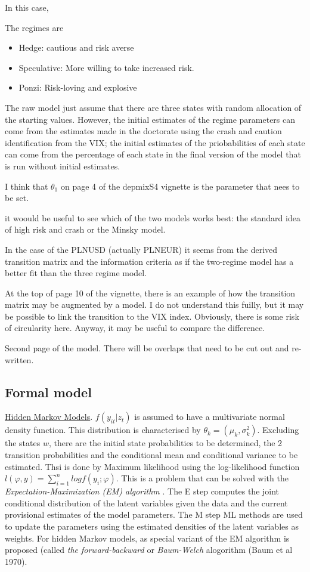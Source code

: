\documentclass[12pt, a4paper, oneside]{article} %
\begin{document}
In this case, 

The regimes are
\begin{itemize}
\item Hedge: cautious and risk averse
\item Speculative: More willing to take increased risk. 
\item Ponzi:  Risk-loving and explosive
\end{itemize}


The raw model just assume that there are three states with random allocation of the starting values.  However, the initial estimates of the regime parameters can come from the estimates made in the doctorate using the crash and caution identification from the VIX; the initial estimates of the priobabilities of each state can come from the percentage of each state in the final version of the model that is run without initial estimates.  

I think that $\theta_1$ on page 4 of the depmixS4 vignette is the parameter that nees to be set. 

it woould be useful to see which of the two models works best: the standard idea of high risk and crash or the Minsky model.  

In the case of the PLNUSD (actually PLNEUR) it seems from the derived transition matrix and the information criteria as if the two-regime model has a better fit than the three regime model. 

At the top of page 10 of the vignette, there is an example of how the transition matrix may be augmented by a model.  I do not understand this fuilly, but it may be possible to link the transition to the VIX index.  Obviously, there is some risk of circularity here. Anyway, it may be useful to compare the difference. 

Second page of the model.  There will be overlaps that need to be cut out and re-written. 

\subsection{Formal model}
\href{http://en.wikipedia.org/wiki/Hidden_Markov_model}{Hidden Markov Models}.  
$f(y_{it}|z_t)$ is assumed to have a multivariate normal density function. This distribution is characterised by $\theta_k = (\mu_k, \sigma_k^2)$.  Excluding the states $w$, there are the initial state probabilities to be determined, the 2 transition probabilities and the conditional mean and conditional variance to be estimated.  Thsi is done by Maximum likelihood using the log-likelihood function $l(\varphi, y) = \sum_{i=1}^n log f(y_i; \varphi)$. This is a problem that can be solved with the \emph{Expectation-Maximization (EM) algorithm} \citet{dempster1977maximum}. The E step computes the joint conditional distribution of the latent variables given the data and the current provisional estimates of the model parameters. The M step ML methods are used to update the parameters using the estimated densities of the latent variables as weights. For hidden Markov models, as special variant of the EM algorithm is proposed (called \emph{the forward-backward} or \emph{Baum-Welch} alogorithm (Baum et al 1970).   
\end{document}
